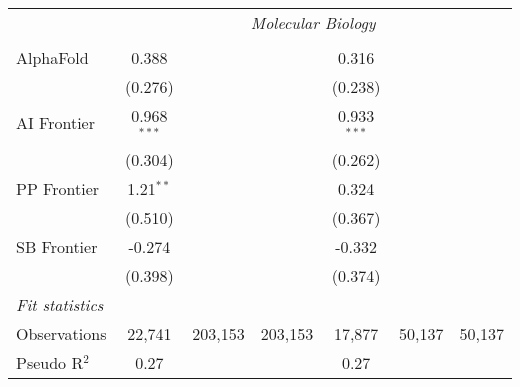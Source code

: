 \begin{tabular}{lcccccc}
 & \multicolumn{6}{c}{\textit{Molecular Biology}} \\ \\
   AlphaFold    & 0.388         &         &         & 0.316         &        &   \\   
                & (0.276)       &         &         & (0.238)       &        &   \\   
   AI Frontier  & 0.968$^{***}$ &         &         & 0.933$^{***}$ &        &   \\   
                & (0.304)       &         &         & (0.262)       &        &   \\   
   PP Frontier  & 1.21$^{**}$   &         &         & 0.324         &        &   \\   
                & (0.510)       &         &         & (0.367)       &        &   \\   
   SB Frontier  & -0.274        &         &         & -0.332        &        &   \\   
                & (0.398)       &         &         & (0.374)       &        &   \\   
   \midrule
   \emph{Fit statistics}\\
   Observations & 22,741        & 203,153 & 203,153 & 17,877        & 50,137 & 50,137\\  
   Pseudo R$^2$ & 0.27          &         &         & 0.27          &        & \\  
   

\end{tabular}
